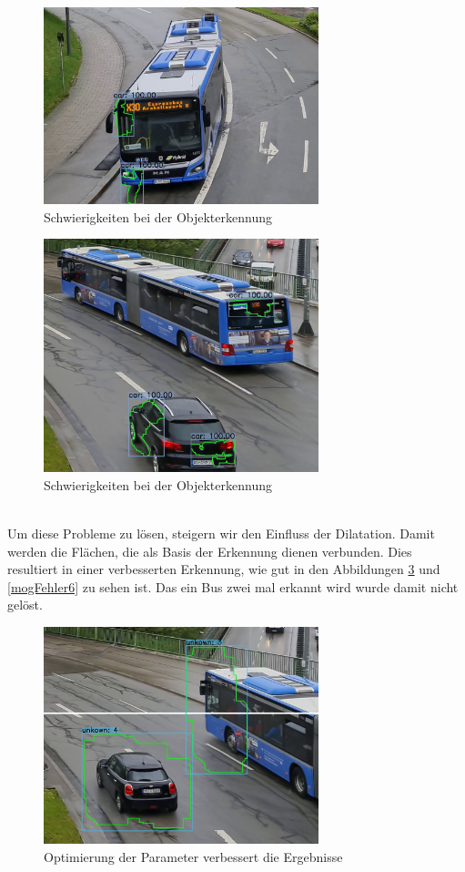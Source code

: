 \documentclass[conference]{IEEEtran}
\begin{document}
	\begin{figure}[!h]
		\begin{center}
			\includegraphics[width=8cm]{Media/Output_847MOG1.jpg}
			\caption{Schwierigkeiten bei der Objekterkennung}
			\label{mogFehler3}
		\end{center}
	\end{figure}
	\begin{figure}[!h]
		\begin{center}
			\includegraphics[width=8cm]{Media/Output_847MOG2.jpg}
			\caption{Schwierigkeiten bei der Objekterkennung}
			\label{mogFehler4}
		\end{center}
	\end{figure}\\
	Um diese Probleme zu lösen, steigern wir den Einfluss der Dilatation. Damit werden die Flächen, die als Basis der Erkennung dienen verbunden. Dies resultiert in einer verbesserten Erkennung, wie gut in den Abbildungen \ref{mogFehler5} und \ref{mogFehler6} zu sehen ist.
	Das ein Bus zwei mal erkannt wird wurde damit nicht gelöst.\\
	\begin{figure}[!h]
		\begin{center}
			\includegraphics[width=8cm]{Media/Output_733-MOGV2Cut.jpg}
			\caption{Optimierung der Parameter verbessert die Ergebnisse}
			\label{mogFehler5}
		\end{center}
	\end{figure}
\end{document}
